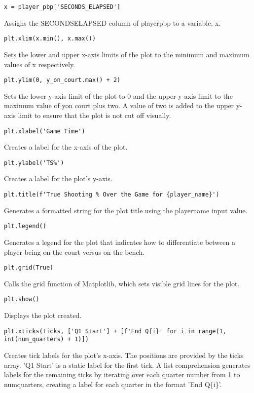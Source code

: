 \documentclass{article}
\begin{document}
\begin{lstlisting}
x = player_pbp['SECONDS_ELAPSED']
\end{lstlisting}
Assigns the SECONDS\textunderscore ELAPSED column of player\textunderscore pbp to a variable, x.
\begin{lstlisting}
plt.xlim(x.min(), x.max())
\end{lstlisting}
Sets the lower and upper x-axis limits of the plot to the minimum and maximum values of x respectively.
\begin{lstlisting}
plt.ylim(0, y_on_court.max() + 2)
\end{lstlisting}
Sets the lower y-axis limit of the plot to 0 and the upper y-axis limit to the maximum value of y\textunderscore on \textunderscore court plus two. A value of two is added to the upper y-axis limit to ensure that the plot is not cut off visually.
\begin{lstlisting}
plt.xlabel('Game Time')
\end{lstlisting}
Creates a label for the x-axis of the plot.
\begin{lstlisting}
plt.ylabel('TS%')
\end{lstlisting}
Creates a label for the plot's y-axis.
\begin{lstlisting}
plt.title(f'True Shooting % Over the Game for {player_name}')
\end{lstlisting}
Generates a formatted string for the plot title using the player\textunderscore name input value.
\begin{lstlisting}
plt.legend()
\end{lstlisting}
Generates a legend for the plot that indicates how to differentiate between a player being on the court versus on the bench.
\begin{lstlisting}
plt.grid(True)
\end{lstlisting}
Calls the grid function of Matplotlib, which sets visible grid lines for the plot.
\begin{lstlisting}
plt.show()
\end{lstlisting}
Displays the plot created.
\begin{lstlisting}
plt.xticks(ticks, ['Q1 Start'] + [f'End Q{i}' for i in range(1, int(num_quarters) + 1)])
\end{lstlisting}
Creates tick labels for the plot's x-axis. The positions are provided by the ticks array. 'Q1 Start' is a static label for the first tick. A list comprehension generates labels for the remaining ticks by iterating over each quarter number from 1 to num\textunderscore quarters, creating a label for each quarter in the format 'End Q\{i\}'.
\end{document}
